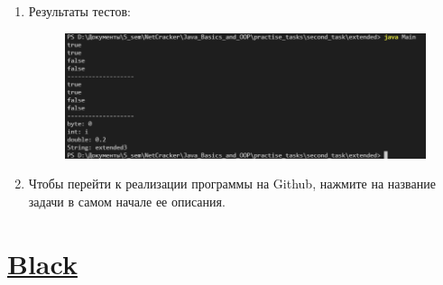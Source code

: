 \documentclass[a4paper]{article}
\begin{document}
\begin{enumerate}
        \item Результаты тестов:
        
        \begin{figure}[h!]
            \begin{center}
                \includegraphics[scale = 0.6]{test_t3.png}
                \label{p2} %
            \end{center}
        \end{figure}

        \item Чтобы перейти к реализации программы на Github, нажмите на название задачи в самом начале ее описания.
    
    \end{enumerate}

    \section{\href{https://github.com/julproh/5_sem/tree/main/NetCracker/Java_Basics_and_OOP/practise_tasks/second_task/black}{Black}}
\end{document}
